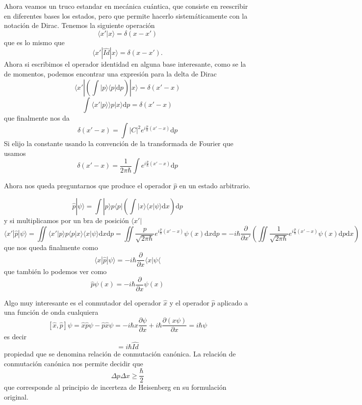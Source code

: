 Ahora veamos un truco estandar en mecánica cuántica, que consiste en reescribir en diferentes bases los estados, pero que permite hacerlo sistemáticamente con la notación de Dirac.
Tenemos la siguiente operación
\[ \langle x' | x \rangle = \delta(x - x')\]
que es lo mismo que
\[ \langle x' | \hat{Id} | x \rangle = \delta(x - x').\]
Ahora si escribimos el operador identidad en alguna base interesante, como se la de momentos, podemos encontrar una expresión para la delta de Dirac
\[ \langle x' |\left( \int |p\rangle \langle p | \mathrm{d}p \right)| x \rangle = \delta(x' - x)\]
\[ \int \langle x' | p \rangle \rangle p | x \rangle \mathrm{d}p = \delta(x' - x)\]
que finalmente nos da
\[ \delta(x' - x) = \int |C|^2 e^{i \frac{p}{\hbar}(x' - x)} \mathrm{d}p\]
Si elijo la constante usando la convención de la transformada de Fourier que usamos
\begin{equation}
 \delta(x' - x) = \frac{1}{2\pi\hbar} \int e^{i \frac{p}{\hbar} (x' - x)} \mathrm{d}p
\end{equation}

Ahora nos queda preguntarnos que produce el operador $\hat{p}$ en un estado arbitrario.

\[ \hat{p}|\psi\rangle = \int |p\rangle p \langle p|\left(\int | x \rangle \langle x |\psi \rangle \mathrm{d}x \right) \mathrm{d}p \]
y si multiplicamos por un bra de posición $\langle x'|$
\[ \langle x' | \hat{p} | \psi \rangle = \iint \langle x'|p\rangle p \langle p | x \rangle \langle x | \psi \rangle \mathrm{d}x\mathrm{d}p = \iint \frac{p}{\sqrt{2\pi\hbar}} e^{i \frac{p}{\hbar} (x' - x)} \psi(x) \mathrm{d}x \mathrm{d}p = -i \hbar \frac{\partial}{\partial x'} \left(\iint \frac{1}{\sqrt{2\pi\hbar}} e^{i \frac{p}{\hbar} (x' - x)} \psi(x) \mathrm{d}p \mathrm{d}x \right)\]
que nos queda finalmente como
\begin{equation}
\langle x | \hat{p} | \psi \rangle = - i \hbar \frac{\partial}{\partial x} \langle x | \psi\langle
\label{eq:operador_p_estado}
\end{equation}
que también lo podemos ver como
\begin{equation}
 \hat{p} \psi(x) = - i \hbar \frac{\partial}{\partial x} \psi(x)
\end{equation}

Algo muy interesante es el conmutador del operador $\hat{x}$ y el operador $\hat{p}$ aplicado a una función de onda cualquiera
\[[\hat{x},\hat{p}]\psi = \hat{x}\hat{p}\psi - \hat{p}\hat{x}\psi = -i \hbar x \frac{\partial \psi}{\partial x} + i \hbar \frac{\partial (x \psi)}{\partial x} = i \hbar \psi \]
es decir 
\begin{equation}
[\hat{x},\hat{p}] = i \hbar \hat{Id}
\end{equation}
propiedad que se denomina relación de conmutación canónica. 
La relación de conmutación canónica nos permite decidir que
\begin{equation}
\Delta p \Delta x \geq \frac{\hbar}{2}
\end{equation}
que corresponde al principio de incerteza de Heisenberg en su formulación original.

